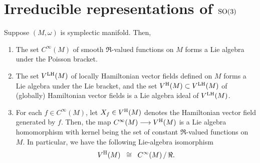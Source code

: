 

\chapter{Irreducible representations of $\textnormal{SO}(3)$}
\setcounter{theorem}{0}
\setcounter{equation}{0}


\renewcommand{\theenumi}{\roman{enumi}}
\renewcommand{\labelenumi}{\textnormal{(\theenumi)}$\;\;$}


\begin{theorem}
\mbox{}
\vskip 0.2cm
\noindent
Suppose $(M,\omega)$ is symplectic manifold. Then,
\begin{enumerate}
\item
	The set $C^{\infty}(M)$ of smooth $\Re$-valued functions on $M$
	forms a Lie algebra under the Poisson bracket.
\item
	The set $V^{\textnormal{LH}}(M)$ of locally Hamiltonian vector fields defined on $M$
	forms a Lie algebra under the Lie bracket, and
	the set $V^{\textnormal{H}}(M) \subset V^{\textnormal{LH}}(M)$ of (globally) Hamiltonian vector fields
	is a Lie algebra ideal of $V^{\textnormal{LH}}(M)$.
\item
	For each $f \in C^{\infty}(M)$, let $X_{f} \in V^{\textnormal{H}}(M)$ denotes the Hamiltonian vector field generated by $f$.
	Then, the map $C^{\infty}(M) \longrightarrow V^{\textnormal{H}}(M)$ is a Lie algebra homomorphism
	with kernel being the set of constant $\Re$-valued functions on $M$.
	In particular, we have the following Lie-algebra isomorphism
	\begin{equation*}
	V^{\textnormal{H}}(M) \;\; \cong \;\; C^{\infty}(M) \,/\, \Re.
	\end{equation*}
\end{enumerate}
\end{theorem}



